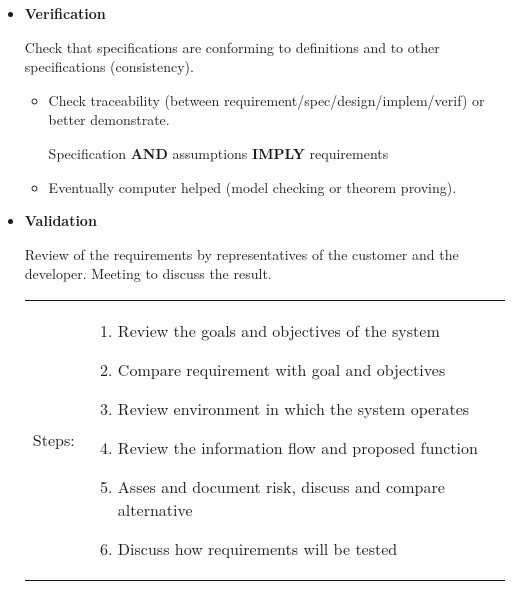 \begin{itemize}

\item \textbf{Verification}

Check that specifications are conforming to definitions and to other specifications (consistency). 
\begin{itemize} 
    \item Check traceability (between requirement/spec/design/implem/verif) or better demonstrate.
        \begin{center}
            Specification \textbf{AND} assumptions \textbf{IMPLY} requirements
        \end{center}
    \item Eventually computer helped (model checking or theorem proving).
\end{itemize}

\item \textbf{Validation}

    Review of the requirements by representatives of the customer and the developer. Meeting to discuss the result. 

    \begin{tabular}{cm{10cm}}
        Steps:&
        \begin{enumerate}
            \item Review the goals and objectives of the system
            \item Compare requirement with goal and objectives
            \item Review environment in which the system operates
            \item Review the information flow and proposed function
            \item Asses and document risk, discuss and compare
                alternative 
            \item Discuss how requirements will be tested
        \end{enumerate}
    \end{tabular}
\end{itemize}
